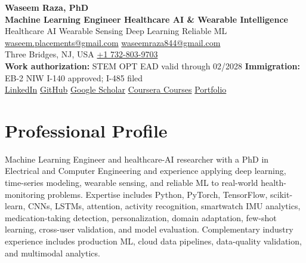 \documentclass[9pt,letterpaper]{extarticle}
\begin{document}
\begin{center}
{\LARGE\bfseries Waseem Raza, PhD}{\normalsize\mdseries }\\[2pt]
{\large\bfseries Machine Learning Engineer \textbar{} Healthcare AI \& Wearable Intelligence}\\[1pt]
{\small Healthcare AI \textbar{} Wearable Sensing \textbar{} Deep Learning \textbar{} Reliable ML}\\[3pt]
{\footnotesize {}\enspace \href{mailto:waseem.placements@gmail.com}{waseem.placements@gmail.com} \textbar{} \href{mailto:waseemraza844@gmail.com}{waseemraza844@gmail.com}\\[1pt]Three Bridges, NJ, USA \quad {}\enspace \href{tel:+17328039703}{+1 732-803-9703}\\[1pt]{\scriptsize \textbf{Work authorization:} STEM OPT EAD valid through 02/2028 \textbar{} \textbf{Immigration:} EB-2 NIW I-140 approved; I-485 filed}\\[1pt]\href{https://www.linkedin.com/in/waseem-raza-phd-9a737858/}{LinkedIn} \textbar{} \href{https://github.com/WaseemRaza844}{GitHub} \textbar{} \href{https://scholar.google.com/citations?user=d58Drr0AAAAJ\&hl=en}{Google Scholar} \textbar{} \href{https://waseemraza844.github.io/portfolio/learning.html}{Coursera Courses} \textbar{} \href{https://waseemraza844.github.io/portfolio/}{Portfolio}}
\end{center}
\vspace{-5pt}
\section{Professional Profile}
Machine Learning Engineer and healthcare-AI researcher with a PhD in Electrical and Computer Engineering and experience applying deep learning, time-series modeling, wearable sensing, and reliable ML to real-world health-monitoring problems. Expertise includes Python, PyTorch, TensorFlow, scikit-learn, CNNs, LSTMs, attention, activity recognition, smartwatch IMU analytics, medication-taking detection, personalization, domain adaptation, few-shot learning, cross-user validation, and model evaluation. Complementary industry experience includes production ML, cloud data pipelines, data-quality validation, and multimodal analytics.
\end{document}
